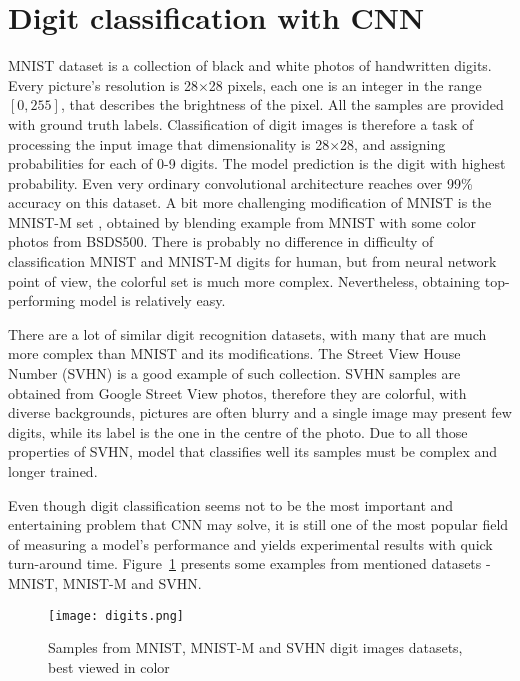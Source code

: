 \documentclass[shortabstract, inz, english]{iithesis}
\begin{document}
\section{Digit classification with CNN}
MNIST dataset \cite{mnist} is a collection of black and white photos of handwritten digits. Every picture's resolution is 28$\times$28 pixels, each one is an integer in the range $[0,255]$, that describes the brightness of the pixel. All the samples are provided with ground truth labels. Classification of digit images is therefore a task of processing the input image that dimensionality is 28$\times$28, and assigning probabilities for each of 0-9 digits. The model prediction is the digit with highest probability. Even very ordinary convolutional architecture reaches over 99\% accuracy on this dataset. A bit more challenging modification of MNIST is the MNIST-M set \cite{mnist-m}, obtained by blending example from MNIST with some color photos from BSDS500. There is probably no difference in difficulty of classification MNIST and MNIST-M digits for human, but from neural network point of view, the colorful set is much more complex. Nevertheless, obtaining top-performing model is relatively easy.
\par
There are a lot of similar digit recognition datasets, with many that are much more complex than MNIST and its modifications. The Street View House Number (SVHN) is a good example of such collection. SVHN samples are obtained from Google Street View photos, therefore they are colorful, with diverse backgrounds, pictures are often blurry and a single image may present few digits, while its label is the one in the centre of the photo. Due to all those properties of SVHN, model that classifies well its samples must be complex and longer trained. 
\par
Even though digit classification seems not to be the most important and entertaining problem that CNN may solve, it is still one of the most popular field of measuring a model's performance and yields experimental results with quick turn-around time. Figure~\ref{fig:digits} presents some examples from mentioned datasets - MNIST, MNIST-M and SVHN.

\begin{figure}%
    \centering
    \texttt{[image: digits.png]}%
    \caption{Samples from MNIST, MNIST-M and SVHN digit images datasets, best viewed in color}
    \label{fig:digits}%
\end{figure}
\end{document}
